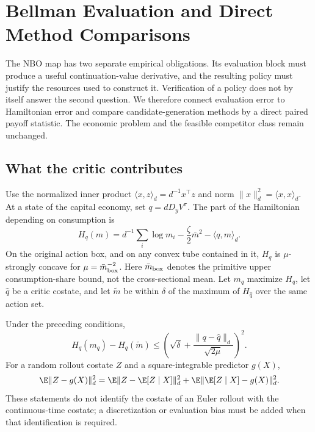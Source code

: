 \section{Bellman Evaluation and Direct Method Comparisons}\label{sec:r13theory}
The NBO map has two separate empirical obligations. Its evaluation block must produce a useful continuation-value derivative, and the resulting policy must justify the resources used to construct it. Verification of a policy does not by itself answer the second question. We therefore connect evaluation error to Hamiltonian error and compare candidate-generation methods by a direct paired payoff statistic. The economic problem and the feasible competitor class remain unchanged.

\subsection{What the critic contributes}
Use the normalized inner product $\langle x,z\rangle_d=d^{-1}x^\top z$ and norm $\|x\|_d^2=\langle x,x\rangle_d$. At a state of the capital economy, set $q=dD_yV^\pi$. The part of the Hamiltonian depending on consumption is
\[
 H_q(m)=d^{-1}\sum_i\log m_i-\frac\zeta2\bar m^2-\langle q,m\rangle_d.
\]
On the original action box, and on any convex tube contained in it, $H_q$ is $\mu$-strongly concave for $\mu=\bar m_{\rm box}^{-2}$. Here $\bar m_{\rm box}$ denotes the primitive upper consumption-share bound, not the cross-sectional mean. Let $m_q$ maximize $H_q$, let $\widehat q$ be a critic costate, and let $\widetilde m$ be within $\delta$ of the maximum of $H_{\widehat q}$ over the same action set.

\begin{proposition}\label{prop:r13costate}
Under the preceding conditions,
\begin{equation}\label{eq:r13actionloss}
 H_q(m_q)-H_q(\widetilde m)
 \leq\left(\sqrt\delta+\frac{\|q-\widehat q\|_d}{\sqrt{2\mu}}\right)^2.
\end{equation}
For a random rollout costate $Z$ and a square-integrable predictor $g(X)$,
\begin{equation}\label{eq:r13projection}
 \E\|Z-g(X)\|_d^2
 =\E\|Z-\E[Z\mid X]\|_d^2+
   \E\|\E[Z\mid X]-g(X)\|_d^2.
\end{equation}
These statements do not identify the costate of an Euler rollout with the continuous-time costate; a discretization or evaluation bias must be added when that identification is required.
\end{proposition}

